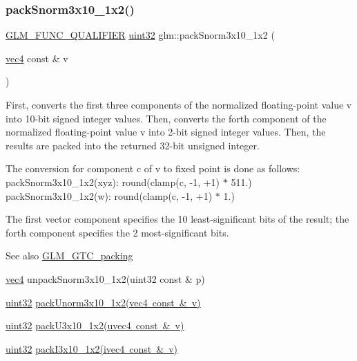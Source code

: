 \subsubsection{\texorpdfstring{packSnorm3x10\_1x2()}{packSnorm3x10\_1x2()}}
{\footnotesize\ttfamily \mbox{\hyperlink{setup_8hpp_a33fdea6f91c5f834105f7415e2a64407}{G\+L\+M\+\_\+\+F\+U\+N\+C\+\_\+\+Q\+U\+A\+L\+I\+F\+I\+ER}} \mbox{\hyperlink{group__gtc__type__precision_ga202b6a53c105fcb7e531f9b443518451}{uint32}} glm\+::pack\+Snorm3x10\+\_\+1x2 (\begin{DoxyParamCaption}\item[{\mbox{\hyperlink{group__core__types_ga5881b1b022d7fd1b7218f5916532dd02}{vec4}} const \&}]{v }\end{DoxyParamCaption})}

First, converts the first three components of the normalized floating-\/point value v into 10-\/bit signed integer values. Then, converts the forth component of the normalized floating-\/point value v into 2-\/bit signed integer values. Then, the results are packed into the returned 32-\/bit unsigned integer.

The conversion for component c of v to fixed point is done as follows\+: pack\+Snorm3x10\+\_\+1x2(xyz)\+: round(clamp(c, -\/1, +1) $\ast$ 511.) pack\+Snorm3x10\+\_\+1x2(w)\+: round(clamp(c, -\/1, +1) $\ast$ 1.)

The first vector component specifies the 10 least-\/significant bits of the result; the forth component specifies the 2 most-\/significant bits.

\begin{DoxySeeAlso}{See also}
\mbox{\hyperlink{group__gtc__packing}{G\+L\+M\+\_\+\+G\+T\+C\+\_\+packing}} 

\mbox{\hyperlink{group__core__types_ga5881b1b022d7fd1b7218f5916532dd02}{vec4}} unpack\+Snorm3x10\+\_\+1x2(uint32 const \& p) 

\mbox{\hyperlink{group__gtc__type__precision_ga202b6a53c105fcb7e531f9b443518451}{uint32}} \mbox{\hyperlink{group__gtc__packing_ga2cf2d11b40bd48639110456fd74c2e33}{pack\+Unorm3x10\+\_\+1x2(vec4 const \& v)}} 

\mbox{\hyperlink{group__gtc__type__precision_ga202b6a53c105fcb7e531f9b443518451}{uint32}} \mbox{\hyperlink{group__gtc__packing_gaf656d8862628f96b20de7a36eaa1fe56}{pack\+U3x10\+\_\+1x2(uvec4 const \& v)}} 

\mbox{\hyperlink{group__gtc__type__precision_ga202b6a53c105fcb7e531f9b443518451}{uint32}} \mbox{\hyperlink{group__gtc__packing_ga032e18fa5bc5b8f3897104aeb2f1e195}{pack\+I3x10\+\_\+1x2(ivec4 const \& v)}} 
\end{DoxySeeAlso}


